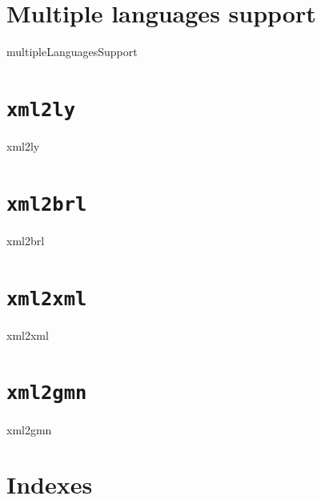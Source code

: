 \documentclass[11pt,a4paper]{report}
\begin{document}
\part{Multiple languages support}

{multipleLanguagesSupport}


\part{{\tt xml2ly}}

{xml2ly}


\part{{\tt xml2brl}}

{xml2brl}


\part{{\tt xml2xml}}

{xml2xml}


\part{{\tt xml2gmn}}

{xml2gmn}



\part{Indexes}

\fancyhead[L]{}
\fancyhead[C]{\nouppercase\leftmark}
\fancyhead[R]{}

\printindex[Files]

\printindex[Options]

\printindex[MusicXML]

\printindex[Main]


\end{document}
